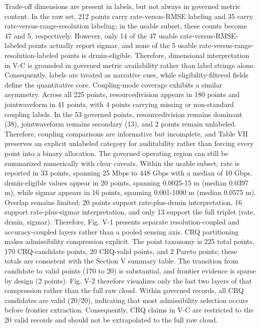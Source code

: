 {}Trade-off dimensions are present in labels, but not always in governed metric content. In the raw set, 212 points carry rate-versus-RMSE labeling and 35 carry rate-versus-range-resolution labeling; in the usable subset, these counts become 47 and 5, respectively. However, only 14 of the 47 usable rate-versus-RMSE-labeled points actually report sigma\markdownRendererUnderscore{}r, and none of the 5 usable rate-versus-range-resolution-labeled points is drmin-eligible. Therefore, dimensional interpretation in V-C is grounded in governed metric availability rather than label strings alone. Consequently, labels are treated as narrative cues, while eligibility-filtered fields define the quantitative core.\markdownRendererParagraphSeparator
{}Coupling-mode coverage exhibits a similar asymmetry. Across all 225 points, resource\markdownRendererUnderscore{}division appears in 180 points and joint\markdownRendererUnderscore{}waveform in 41 points, with 4 points carrying missing or non-standard coupling labels. In the 53 governed points, resource\markdownRendererUnderscore{}division remains dominant (38), joint\markdownRendererUnderscore{}waveform remains secondary (13), and 2 points remain unlabeled. Therefore, coupling comparisons are informative but incomplete, and Table VII preserves an explicit unlabeled category for auditability rather than forcing every point into a binary allocation.\markdownRendererParagraphSeparator
{}The governed operating region can still be summarized numerically with clear caveats. Within the usable subset, rate is reported in 33 points, spanning 25 Mbps to 448 Gbps with a median of 10 Gbps. drmin-eligible values appear in 20 points, spanning 0.0025-15 m (median 0.0397 m), while sigma\markdownRendererUnderscore{}r appears in 16 points, spanning 0.001-1000 m (median 0.0575 m). Overlap remains limited: 20 points support rate-plus-drmin interpretation, 16 support rate-plus-sigma\markdownRendererUnderscore{}r interpretation, and only 13 support the full triplet (rate, drmin, sigma\markdownRendererUnderscore{}r). Therefore, Fig. V-1 presents separate resolution-coupled and accuracy-coupled layers rather than a pooled sensing axis.\markdownRendererParagraphSeparator
{}CRQ partitioning makes admissibility compression explicit. The point taxonomy is 225 total points, 170 CRQ-candidate points, 20 CRQ-valid points, and 2 Pareto points; these totals are consistent with the Section V summary table. The transition from candidate to valid points (170 to 20) is substantial, and frontier evidence is sparse by design (2 points). Fig. V-2 therefore visualizes only the last two layers of that compression rather than the full raw cloud. Within governed records, all CRQ candidates are valid (20/20), indicating that most admissibility selection occurs before frontier extraction. Consequently, CRQ claims in V-C are restricted to the 20 valid records and should not be extrapolated to the full raw cloud.\markdownRendererParagraphSeparator
